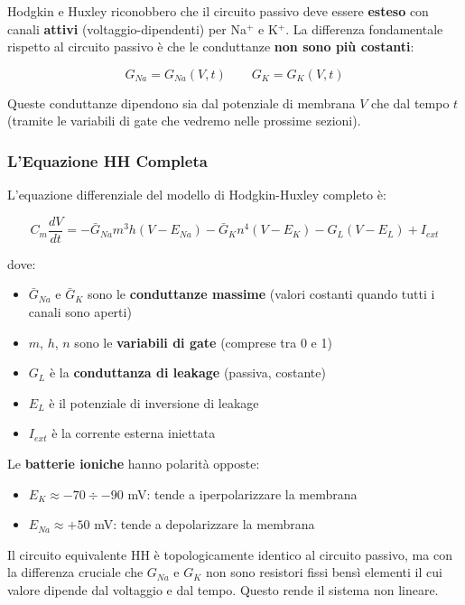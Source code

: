 Hodgkin e Huxley riconobbero che il circuito passivo deve essere \textbf{esteso} con canali \textbf{attivi} (voltaggio-dipendenti) per Na$^+$ e K$^+$. La differenza fondamentale rispetto al circuito passivo è che le conduttanze \textbf{non sono più costanti}:

\begin{equation}
G_{Na} = G_{Na}(V, t) \qquad G_K = G_K(V, t)
\end{equation}

Queste conduttanze dipendono sia dal potenziale di membrana $V$ che dal tempo $t$ (tramite le variabili di gate che vedremo nelle prossime sezioni).

\subsubsection{L'Equazione HH Completa}

L'equazione differenziale del modello di Hodgkin-Huxley completo è:

\begin{equation}
C_m \frac{dV}{dt} = -\bar{G}_{Na} m^3 h (V - E_{Na}) - \bar{G}_K n^4 (V - E_K) - G_L (V - E_L) + I_{ext}
\end{equation}

dove:
\begin{itemize}
    \item $\bar{G}_{Na}$ e $\bar{G}_K$ sono le \textbf{conduttanze massime} (valori costanti quando tutti i canali sono aperti)
    \item $m$, $h$, $n$ sono le \textbf{variabili di gate} (comprese tra 0 e 1)
    \item $G_L$ è la \textbf{conduttanza di leakage} (passiva, costante)
    \item $E_L$ è il potenziale di inversione di leakage
    \item $I_{ext}$ è la corrente esterna iniettata
\end{itemize}

Le \textbf{batterie ioniche} hanno polarità opposte:
\begin{itemize}
    \item $E_K \approx -70 \div -90$ mV: tende a iperpolarizzare la membrana
    \item $E_{Na} \approx +50$ mV: tende a depolarizzare la membrana
\end{itemize}

\begin{tcolorbox}[colback=gray!5, colframe=gray!40, arc=2mm, boxrule=0.5pt]

Il circuito equivalente HH è topologicamente identico al circuito passivo, ma con la differenza cruciale che $G_{Na}$ e $G_K$ non sono resistori fissi bensì elementi il cui valore dipende dal voltaggio e dal tempo. Questo rende il sistema non lineare.
\end{tcolorbox}


